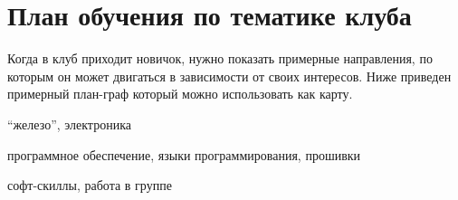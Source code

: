 \pagebreak
\chapter{План обучения по тематике клуба}

\nopagebreak
Когда в клуб приходит новичок, нужно показать примерные направления, по которым
он может двигаться в зависимости от своих интересов. Ниже приведен примерный
план-граф который можно использовать как карту.

\clearpage
\begin{description}[nosep]
    \item[hard] ``железо'', электроника
    \item[soft] программное обеспечение, языки программирования, прошивки
    \item[group] софт-скиллы, работа в группе
\end{description}

\pagebreak
{}

\pagebreak
{}
